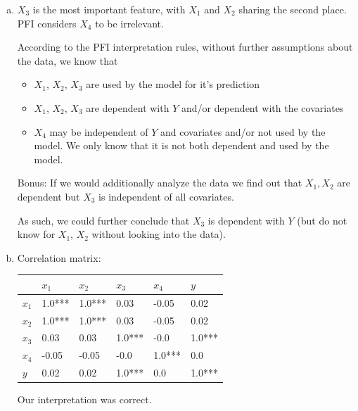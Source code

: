 {\begin{enumerate}[a)]
		Now we apply the method to our model and dataset.
		\begin{algorithm}[H]
			\caption{application}
			\begin{algorithmic}[1]
				\State \texttt{nr\_runs} $\gets$ 10
				\State \texttt{fis\_mean, fis\_std} $\gets$ \texttt{n\_times(nr\_runs, fi\_naive, pfi\_fname, model} prediction function, \texttt{mean\_squared\_error, X\_test, y\_test, return\_raw=False)}
				\State \texttt{plot} bar chart
			\end{algorithmic}
		\end{algorithm}
		
		\item $X_3$ is the most important feature, with $X_1$ and $X_2$ sharing the second place. PFI considers $X_4$ to be irrelevant.
		
		According to the PFI interpretation rules, without further assumptions about the data, we know that
		\begin{itemize}
			\item $X_1$, $X_2$, $X_3$ are used by the model for it's prediction
			\item $X_1$, $X_2$, $X_3$ are dependent with $Y$ and/or dependent with the covariates
			\item $X_4$ may be independent of $Y$ and covariates and/or not used by the model. We only know that it is not both dependent and used by the model.
		\end{itemize}
		Bonus: If we would additionally analyze the data we find out that $X_1, X_2$ are dependent but $X_3$ is independent of all covariates.
		
		As such, we could further conclude that $X_3$ is dependent with $Y$ (but do not know for $X_1$, $X_2$ without looking into the data).
		
		\item Correlation matrix: 
		\begin{table}[H]
			\centering
			\begin{tabular}{l|lllll}
				\hline
				& $x_1$ & $x_2$ & $x_3$ & $x_4$ & $y$ \\
				\hline
				$x_1$ &  1.0*** &  1.0*** &  0.03 & -0.05 &  0.02 \\
				$x_2$ &  1.0*** &  1.0*** &  0.03 & -0.05 &  0.02 \\
				$x_3$ &  0.03 &  0.03 &  1.0*** & -0.0 &  1.0*** \\
				$x_4$ & -0.05 & -0.05 & -0.0 &  1.0*** &  0.0 \\
				$y$ &  0.02 &  0.02 &  1.0*** &  0.0 &  1.0*** \\
				\hline
			\end{tabular}
		\end{table}
		Our interpretation was correct.
		

\end{enumerate}}
